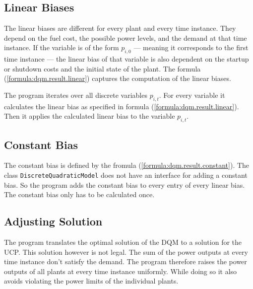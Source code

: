 \subsection*{Linear Biases}

The linear biases are different for every plant and every time instance.
They depend on the fuel cost, the possible power levels, and the demand at that time instance.
If the variable is of the form $p_{i, 0}$ --- meaning it corresponds to the first time instance --- the linear bias of that variable is also dependent on the startup or shutdown costs and the initial state of the plant.
The formula (\ref{formula:dqm.result.linear}) captures the computation of the linear biases.

The program iterates over all discrete variables $p_{i, t}$.
For every variable it calculates the linear bias as specified in formula (\ref{formula:dqm.result.linear}).
Then it applies the calculated linear bias to the variable $p_{i, t}$.

\subsection*{Constant Bias}

The constant bias is defined by the fromula (\ref{formula:dqm.result.constant}).
The class \texttt{DiscreteQuadraticModel} does not have an interface for adding a constant bias.
So the program adds the constant bias to every entry of every linear bias.
The constant bias only has to be calculated once.

\subsection{Adjusting Solution}
\label{approach:annealing.implementation.adjust}

The program translates the optimal solution of the DQM to a solution for the UCP.
This solution however is not legal.
The sum of the power outputs at every time instance don't satisfy the demand.
The program therefore raises the power outputs of all plants at every time instance uniformly.
While doing so it also avoids violating the power limits of the individual plants.

